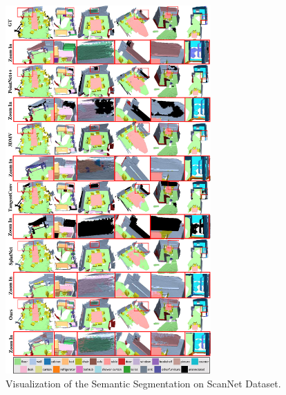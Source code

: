 \begin{figure}
\centering
\includegraphics[width=0.7\textwidth]{texturenet/supplemental/supple_scannet1.pdf}
\caption{Visualization of the Semantic Segmentation on ScanNet Dataset.}
\label{fig:texturenet-supple-scannet1}
\end{figure}

